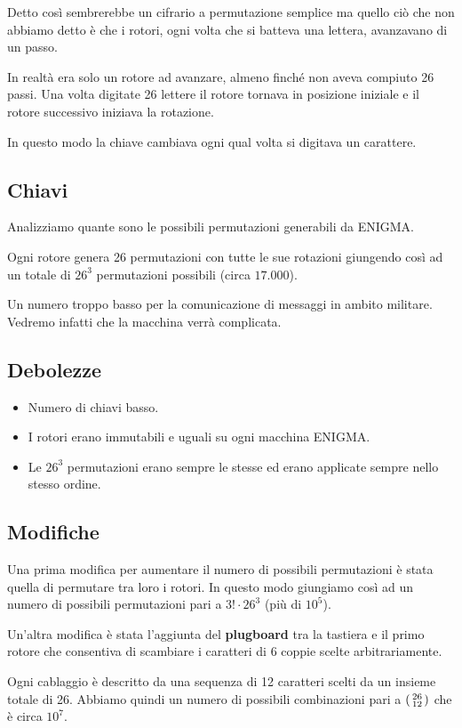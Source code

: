 Detto cos\`i sembrerebbe un cifrario a permutazione semplice ma quello ci\`o che non abbiamo detto \`e che i rotori, ogni
volta che si batteva una lettera, avanzavano di un passo.

In realt\`a era solo un rotore ad avanzare, almeno finch\'e non aveva compiuto 26 passi. Una volta digitate 26 lettere
il rotore tornava in posizione iniziale e il rotore successivo iniziava la rotazione.

In questo modo la chiave cambiava ogni qual volta si digitava un carattere.

\subsection{Chiavi}
Analizziamo quante sono le possibili permutazioni generabili da ENIGMA.

Ogni rotore genera 26 permutazioni con tutte le sue rotazioni giungendo cos\`i ad un totale di $26^3$ permutazioni
possibili (circa $17.000$).

Un numero troppo basso per la comunicazione di messaggi in ambito militare. Vedremo infatti che la macchina verr\`a
complicata.

\subsection{Debolezze}
\begin{itemize}
	\item Numero di chiavi basso.
	\item I rotori erano immutabili e uguali su ogni macchina ENIGMA.
	\item Le $26^3$ permutazioni erano sempre le stesse ed erano applicate sempre nello stesso ordine.
\end{itemize}

\subsection{Modifiche}
Una prima modifica per aumentare il numero di possibili permutazioni \`e stata quella di permutare tra loro i rotori. In
questo modo giungiamo cos\`i ad un numero di possibili permutazioni pari a $3! \cdot 26^3$ (pi\`u di $10^5$).

Un'altra modifica \`e stata l'aggiunta del \textbf{plugboard} tra la tastiera e il primo rotore che consentiva di scambiare
i caratteri di 6 coppie scelte arbitrariamente.

Ogni cablaggio \`e descritto da una sequenza di 12 caratteri scelti da un insieme totale di 26. Abbiamo quindi un numero
di possibili combinazioni pari a $\begin{psmallmatrix} 26 \\ 12 \end{psmallmatrix}$ che \`e circa $10^7$.

